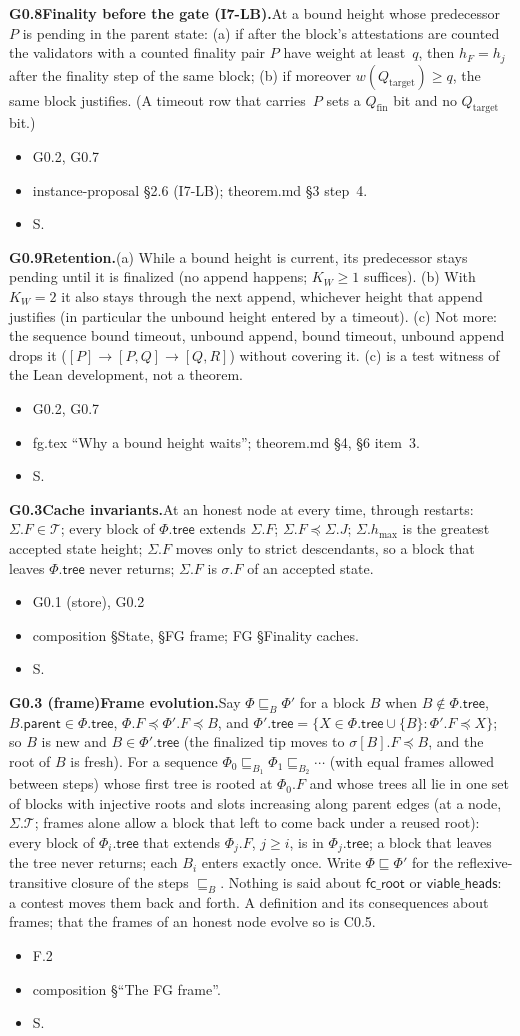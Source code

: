 \documentclass{article}
\newcommand{\parent}{\mathsf{parent}}
\newcommand{\T}{\mathcal T}
\newcommand{\hmax}{h_{\max}}
\newcommand{\Fr}{\Phi}
\newcommand{\fcroot}{\mathsf{fc\_root}}
\newcommand{\allowed}{\mathsf{viable\_heads}}
\newcommand{\Qtarget}{Q_{\mathrm{target}}}
\newcommand{\Qfin}{Q_{\mathrm{fin}}}
\newcommand{\dagnode}[6]{%
\par\medskip\noindent\textbf{#1\enspace #2.}\enspace #3
\begin{itemize}[leftmargin=2.2em,itemsep=0pt,topsep=2pt]
\item[\emph{Uses}] #4
\item[\emph{Evid.}] #5
\item[\emph{Task}] #6
\end{itemize}}
\begin{document}
\dagnode{G0.8}{Finality before the gate (I7-LB)}{At a bound height whose
predecessor $P$ is pending in the parent state: (a) if after the block's
attestations are counted the validators with a counted finality pair $P$
have weight at least~$q$, then $h_F=h_j$ after the finality step of the same
block; (b) if moreover $w(\Qtarget)\geq q$, the same block justifies.  (A
timeout row that carries~$P$ sets a $\Qfin$ bit and no $\Qtarget$ bit.)}
{G0.2, G0.7}{instance-proposal \S2.6 (I7-LB); theorem.md \S3 step~4.}{S.}

\dagnode{G0.9}{Retention}{(a) While a bound height is current, its
predecessor stays pending until it is finalized (no append happens; $K_W\geq1$
suffices).  (b) With $K_W=2$ it also stays through the next append, whichever
height that append justifies (in particular the unbound height entered by a
timeout).  (c) Not more: the
sequence bound timeout, unbound append, bound timeout, unbound append drops
it ($[P]\to[P,Q]\to[Q,R]$) without covering it.  (c) is a test witness of the
Lean development, not a theorem.}
{G0.2, G0.7}{fg.tex ``Why a bound height waits''; theorem.md \S4, \S6
item~3.}{S.}

\dagnode{G0.3}{Cache invariants}{At an honest node at every time, through
restarts: $\Sigma.F\in\T$; every block of $\Fr.\mathsf{tree}$ extends
$\Sigma.F$; $\Sigma.F\preceq\Sigma.J$; $\Sigma.\hmax$ is the greatest
accepted state height; $\Sigma.F$ moves only to strict descendants, so a block
that leaves $\Fr.\mathsf{tree}$ never returns; $\Sigma.F$ is $\sigma.F$ of an
accepted state.}
{G0.1 (store), G0.2}{composition \S State, \S FG frame; FG \S Finality caches.}{S.}

\dagnode{G0.3 (frame)}{Frame evolution}{Say $\Fr\sqsubseteq_B\Fr'$ for a block
$B$ when $B\notin\Fr.\mathsf{tree}$, $B.\parent\in\Fr.\mathsf{tree}$,
$\Fr.F\preceq\Fr'.F\preceq B$, and $\Fr'.\mathsf{tree}=\{X\in\Fr.\mathsf{tree}
\cup\{B\}:\Fr'.F\preceq X\}$; so $B$ is new and $B\in\Fr'.\mathsf{tree}$ (the
finalized tip moves to $\sigma[B].F\preceq B$, and the root of $B$ is fresh).  For a sequence $\Fr_0\sqsubseteq_{B_1}\Fr_1
\sqsubseteq_{B_2}\cdots$ (with equal frames allowed between steps) whose first
tree is rooted at $\Fr_0.F$ and whose trees all lie in one set of blocks with
injective roots and slots increasing along parent edges (at a node, $\Sigma.\T$;
frames alone allow a block that left to come back under a reused root): every block
of $\Fr_i.\mathsf{tree}$ that extends $\Fr_j.F$, $j\geq i$, is in
$\Fr_j.\mathsf{tree}$; a block that leaves the tree never returns; each $B_i$
enters exactly once.  Write $\Fr\sqsubseteq\Fr'$ for the reflexive-transitive
closure of the steps $\sqsubseteq_B$.  Nothing is said about $\fcroot$ or $\allowed$: a contest
moves them back and forth.  A definition and its consequences about frames; that
the frames of an honest node evolve so is C0.5.}
{F.2}{composition \S``The FG frame''.}{S.}
\end{document}
